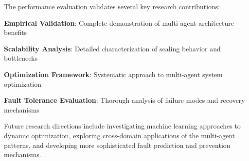 The performance evaluation validates several key research contributions:

\begin{expandedlist}
    \item \textbf{Empirical Validation}: Complete demonstration of multi-agent architecture benefits
    \item \textbf{Scalability Analysis}: Detailed characterization of scaling behavior and bottlenecks
    \item \textbf{Optimization Framework}: Systematic approach to multi-agent system optimization
    \item \textbf{Fault Tolerance Evaluation}: Thorough analysis of failure modes and recovery mechanisms
\end{expandedlist}

Future research directions include investigating machine learning approaches to dynamic optimization, exploring cross-domain applications of the multi-agent patterns, and developing more sophisticated fault prediction and prevention mechanisms.
